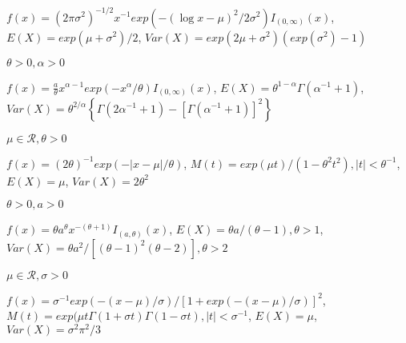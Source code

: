 $f(x)=(2\pi\sigma^2)^{-1/2}x^{-1}exp(-(\log x - \mu)^2 / 2\sigma^2)I_{(0, \infty)}(x)$,
$E(X)=exp(\mu+\sigma^2)/2$,
$Var(X)=exp(2\mu+\sigma^2)(exp(\sigma^2)-1)$

 $\theta>0, \alpha>0$

$f(x)=\frac{a}{\theta}x^{\alpha-1}exp(-x^{\alpha}/\theta)I_{(0, \infty)}(x)$,
$E(X)=\theta^{1-\alpha}\Gamma(\alpha^{-1}+1)$,
$Var(X)=\theta^{2/\alpha}\left\{\Gamma(2\alpha^{-1}+1)-[\Gamma(\alpha^{-1}+1)]^2\right\}$

 $\mu\in\mathcal{R}, \theta>0$

$f(x)=(2\theta)^{-1}exp(-|x-\mu|/\theta)$,
$M(t)=exp(\mu t)/(1-\theta^2t^2), |t|<\theta^{-1}$,
$E(X)=\mu$,
$Var(X)=2\theta^2$

 $\theta > 0, a >0$

$f(x)=\theta a^{\theta} x^{-(\theta+1)}I_{(a, \theta)}(x)$,
$E(X)=\theta a/(\theta - 1), \theta > 1$,
$Var(X)=\theta a^2/[(\theta - 1)^2(\theta - 2)], \theta > 2$

 $\mu\in\mathcal{R}, \sigma>0$

$f(x)=\sigma^{-1}exp(-(x-\mu)/\sigma)/[1+exp(-(x-\mu)/\sigma)]^2$,
$M(t)=exp(\mu t \Gamma(1+\sigma t)\Gamma(1-\sigma t), |t| < \sigma^{-1}$,
$E(X)=\mu$,
$Var(X)=\sigma^2\pi^2/3$